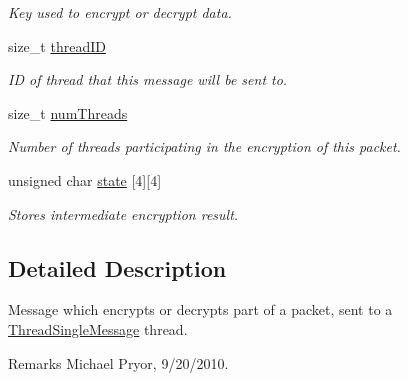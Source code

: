 \begin{DoxyCompactItemize}
\begin{DoxyCompactList}\small\item\em Key used to encrypt or decrypt data. \item\end{DoxyCompactList}\item 
\hypertarget{class_thread_message_item_encrypt_aeef5e81db47fca6a9acb7d57c6fc920b}{
size\_\-t \hyperlink{class_thread_message_item_encrypt_aeef5e81db47fca6a9acb7d57c6fc920b}{threadID}}
\label{class_thread_message_item_encrypt_aeef5e81db47fca6a9acb7d57c6fc920b}

\begin{DoxyCompactList}\small\item\em ID of thread that this message will be sent to. \item\end{DoxyCompactList}\item 
\hypertarget{class_thread_message_item_encrypt_a3fe9fdadc77fa538812e831bd348696b}{
size\_\-t \hyperlink{class_thread_message_item_encrypt_a3fe9fdadc77fa538812e831bd348696b}{numThreads}}
\label{class_thread_message_item_encrypt_a3fe9fdadc77fa538812e831bd348696b}

\begin{DoxyCompactList}\small\item\em Number of threads participating in the encryption of this packet. \item\end{DoxyCompactList}\item 
\hypertarget{class_thread_message_item_encrypt_a0c448c58cf4a1a49c27c1e55c7cbb281}{
unsigned char \hyperlink{class_thread_message_item_encrypt_a0c448c58cf4a1a49c27c1e55c7cbb281}{state} \mbox{[}4\mbox{]}\mbox{[}4\mbox{]}}
\label{class_thread_message_item_encrypt_a0c448c58cf4a1a49c27c1e55c7cbb281}

\begin{DoxyCompactList}\small\item\em Stores intermediate encryption result. \item\end{DoxyCompactList}\end{DoxyCompactItemize}


\subsection{Detailed Description}
Message which encrypts or decrypts part of a packet, sent to a \hyperlink{class_thread_single_message}{ThreadSingleMessage} thread. \begin{DoxyRemark}{Remarks}
Michael Pryor, 9/20/2010. 
\end{DoxyRemark}


